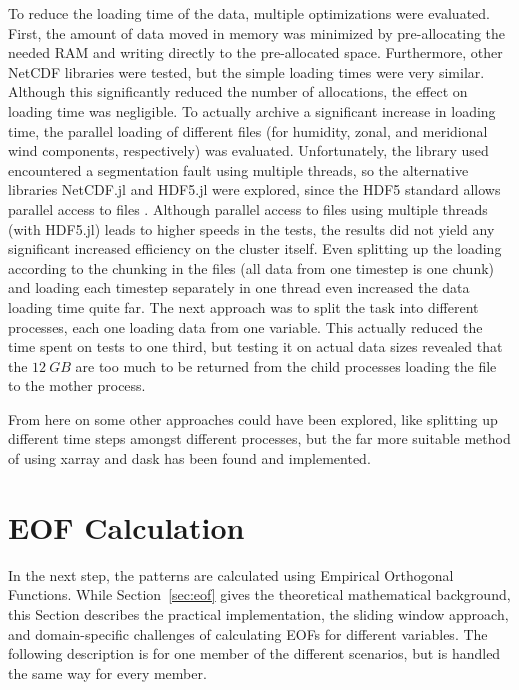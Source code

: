 To reduce the loading time of the data, multiple optimizations were evaluated. 
First, the amount of data moved in memory was minimized by pre-allocating the needed RAM and writing directly to the pre-allocated space. 
Furthermore, other NetCDF libraries were tested, but the simple loading times were very similar. 
Although this significantly reduced the number of allocations, the effect on loading time was negligible. 
To actually archive a significant increase in loading time, the parallel loading of different files (for humidity, zonal, and meridional wind components, respectively) was evaluated. 
Unfortunately, the library used \cite{barth_ncdatasetsjl_2024} encountered a segmentation fault using multiple threads, so the alternative libraries NetCDF.jl and HDF5.jl were explored, since the HDF5 standard allows parallel access to files \cite{folk_overview_2011}. 
Although parallel access to files using multiple threads (with HDF5.jl) leads to higher speeds in the tests, the results did not yield any significant increased efficiency on the cluster itself.
Even splitting up the loading according to the chunking in the files (all data from one timestep is one chunk) and loading each timestep separately in one thread even increased the data loading time quite far.  
The next approach was to split the task into different processes, each one loading data from one variable. This actually reduced the time spent on tests to one third, but testing it on actual data sizes revealed that the $12~GB$ are too much to be returned from the child processes loading the file to the mother process. 

From here on some other approaches could have been explored, like splitting up different time steps amongst different processes, but the far more suitable method of using xarray and dask has been found and implemented.


\section{EOF Calculation}
\label{sec:eof_calc}

In the next step, the patterns are calculated using Empirical Orthogonal Functions. While Section~\ref{sec:eof} gives the theoretical mathematical background, this Section describes the practical implementation, the sliding window approach, and domain-specific challenges of calculating EOFs for different variables. The following description is for one member of the different scenarios, but is handled the same way for every member.  

